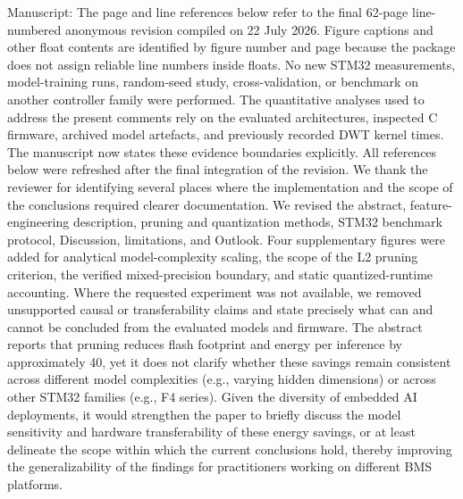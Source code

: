 \markdownRendererDocumentBegin
\markdownRendererSectionBegin
{}\markdownRendererInterblockSeparator
{}Manuscript: \markdownRendererParagraphSeparator
{}The page and line references below refer to the final 62-page line-numbered anonymous revision compiled on 22 July 2026. Figure captions and other float contents are identified by figure number and page because the  package does not assign reliable line numbers inside floats. No new STM32 measurements, model-training runs, random-seed study, cross-validation, or benchmark on another controller family were performed. The quantitative analyses used to address the present comments rely on the evaluated architectures, inspected C firmware, archived model artefacts, and previously recorded DWT kernel times. The manuscript now states these evidence boundaries explicitly. All references below were refreshed after the final integration of the revision.\markdownRendererInterblockSeparator
{}\markdownRendererSectionBegin
{}\markdownRendererInterblockSeparator
{}We thank the reviewer for identifying several places where the implementation and the scope of the conclusions required clearer documentation. We revised the abstract, feature-engineering description, pruning and quantization methods, STM32 benchmark protocol, Discussion, limitations, and Outlook. Four supplementary figures were added for analytical model-complexity scaling, the scope of the L2 pruning criterion, the verified mixed-precision boundary, and static quantized-runtime accounting. Where the requested experiment was not available, we removed unsupported causal or transferability claims and state precisely what can and cannot be concluded from the evaluated models and firmware.\markdownRendererInterblockSeparator
{}
\markdownRendererSectionEnd \markdownRendererSectionBegin
{}\markdownRendererInterblockSeparator
{}\markdownRendererBlockQuoteBegin
The abstract reports that pruning reduces flash footprint and energy per inference by approximately 40\markdownRendererPercentSign{}, yet it does not clarify whether these savings remain consistent across different model complexities (e.g., varying hidden dimensions) or across other STM32 families (e.g., F4 series). Given the diversity of embedded AI deployments, it would strengthen the paper to briefly discuss the model sensitivity and hardware transferability of these energy savings, or at least delineate the scope within which the current conclusions hold, thereby improving the generalizability of the findings for practitioners working on different BMS platforms.\markdownRendererBlockQuoteEnd \markdownRendererInterblockSeparator
